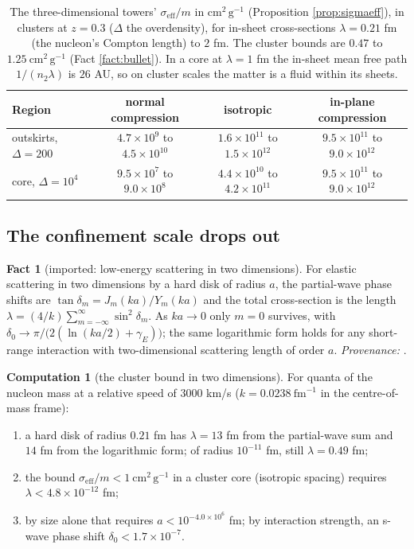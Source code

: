 \documentclass[11pt]{article}
\theoremstyle{definition}
\newtheorem{fact}[theorem]{Fact}
\newtheorem{computation}[theorem]{Computation}
\newcommand{\cmg}{\mathrm{cm^{2}\,g^{-1}}}
\begin{document}
\begin{table}[htbp]\centering\small
\begin{tabular}{@{}lccc@{}}
\toprule
Region & normal compression & isotropic & in-plane compression \\
\midrule
outskirts, $\Delta = 200$ & $4.7\times10^{9}$ to $4.5\times10^{10}$ & $1.6\times10^{11}$ to $1.5\times10^{12}$ & $9.5\times10^{11}$ to $9.0\times10^{12}$ \\
core, $\Delta = 10^{4}$ & $9.5\times10^{7}$ to $9.0\times10^{8}$ & $4.4\times10^{10}$ to $4.2\times10^{11}$ & $9.5\times10^{11}$ to $9.0\times10^{12}$ \\
\bottomrule
\end{tabular}
\caption{The three-dimensional towers' $\sigma_{\mathrm{eff}}/m$ in $\cmg$ (Proposition \ref{prop:sigmaeff}), in clusters at $z = 0.3$ ($\Delta$ the overdensity), for in-sheet cross-sections $\lambda = 0.21$ fm (the nucleon's Compton length) to $2$ fm. The cluster bounds are $0.47$ to $1.25\ \cmg$ (Fact \ref{fact:bullet}). In a core at $\lambda = 1$ fm the in-sheet mean free path $1/(n_{2}\lambda)$ is $26$ AU, so on cluster scales the matter is a fluid within its sheets.}
\label{tab:sidm}
\end{table}

\subsection{The confinement scale drops out}

\begin{fact}[imported: low-energy scattering in two dimensions]\label{fact:2d}
For elastic scattering in two dimensions by a hard disk of radius $a$, the partial-wave phase shifts are $\tan\delta_{m} = J_{m}(ka)/Y_{m}(ka)$ and the total cross-section is the length $\lambda = (4/k)\sum_{m=-\infty}^{\infty}\sin^{2}\delta_{m}$. As $ka \to 0$ only $m = 0$ survives, with $\delta_{0} \to \pi/\bigl(2(\ln(ka/2) + \gamma_{E})\bigr)$; the same logarithmic form holds for any short-range interaction with two-dimensional scattering length of order $a$. \emph{Provenance:} \cite{Adhikari1986}.
\end{fact}

\begin{computation}[the cluster bound in two dimensions]\label{prop:scatter}
For quanta of the nucleon mass at a relative speed of $3000$ km/s ($k = 0.0238\ \mathrm{fm^{-1}}$ in the centre-of-mass frame):
\begin{enumerate}
\item[(i)] a hard disk of radius $0.21$ fm has $\lambda = 13$ fm from the partial-wave sum and $14$ fm from the logarithmic form; of radius $10^{-11}$ fm, still $\lambda = 0.49$ fm;
\item[(ii)] the bound $\sigma_{\mathrm{eff}}/m < 1\ \cmg$ in a cluster core (isotropic spacing) requires $\lambda < 4.8 \times 10^{-12}$ fm;
\item[(iii)] by size alone that requires $a < 10^{-4.0 \times 10^{6}}$ fm; by interaction strength, an s-wave phase shift $\delta_{0} < 1.7 \times 10^{-7}$.
\end{enumerate}
\end{computation}
\end{document}
